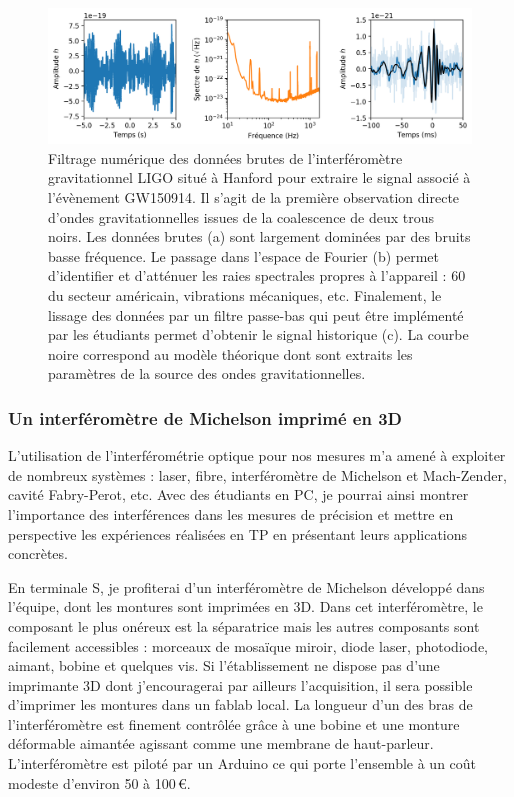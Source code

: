 \documentclass[12pt,a4paper]{article}
\begin{document}
\begin{figure}
\center
\includegraphics[scale=0.75]{figures/GW150914_data.png}
\caption{Filtrage numérique des données brutes de l'interféromètre gravitationnel LIGO situé à Hanford pour extraire le signal associé à l'évènement GW150914.
Il s'agit de la première observation directe d'ondes gravitationnelles issues de la coalescence de deux trous noirs.
Les données brutes (a) sont largement dominées par des bruits basse fréquence.
Le passage dans l'espace de Fourier (b) permet d'identifier et d'atténuer les raies spectrales propres à l'appareil : \unit{60}{\hertz} du secteur américain, vibrations mécaniques, etc.
Finalement, le lissage des données par un filtre passe-bas qui peut être implémenté par les étudiants permet d'obtenir le signal historique (c).
La courbe noire correspond au modèle théorique dont sont extraits les paramètres de la source des ondes gravitationnelles.}
\label{fig:GW150914}
\end{figure}

\subsubsection{Un interféromètre de Michelson imprimé en 3D}

L'utilisation de l'interférométrie optique pour nos mesures m'a amené à exploiter de nombreux systèmes : laser, fibre, interféromètre de Michelson et Mach-Zender, cavité Fabry-Perot, etc.
Avec des étudiants en PC, je pourrai ainsi montrer l'importance des interférences dans les mesures de précision et mettre en perspective les expériences réalisées en TP en présentant leurs applications concrètes.

En terminale S, je profiterai d'un interféromètre de Michelson développé dans l'équipe, dont les montures sont imprimées en 3D.
Dans cet interféromètre, le composant le plus onéreux est la séparatrice mais les autres composants sont facilement accessibles : morceaux de mosaïque miroir, diode laser, photodiode, aimant, bobine et quelques vis.
Si l'établissement ne dispose pas d'une imprimante 3D dont j'encouragerai par ailleurs l'acquisition, il sera possible d'imprimer les montures dans un fablab local.
La longueur d'un des bras de l'interféromètre est finement contrôlée grâce à une bobine et une monture déformable aimantée agissant comme une membrane de haut-parleur.
L'interféromètre est piloté par un Arduino ce qui porte l'ensemble à un coût modeste d'environ 50 à 100\,\euro.
\end{document}
